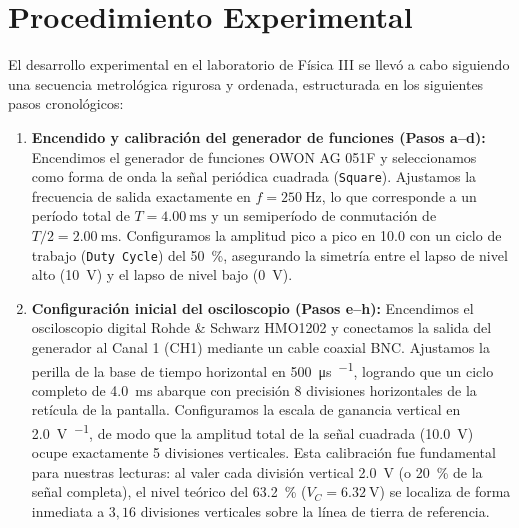 
\section{Procedimiento Experimental}
\label{sec:procedimiento}

El desarrollo experimental en el laboratorio de Física III se llevó a cabo siguiendo una secuencia metrológica rigurosa y ordenada, estructurada en los siguientes pasos cronológicos:

\begin{enumerate}
    \item \textbf{Encendido y calibración del generador de funciones (Pasos a--d):} Encendimos el generador de funciones OWON AG 051F y seleccionamos como forma de onda la señal periódica cuadrada (\texttt{Square}). Ajustamos la frecuencia de salida exactamente en $f = \qty{250}{\hertz}$, lo que corresponde a un período total de $T = \qty{4,00}{\milli\second}$ y un semiperíodo de conmutación de $T/2 = \qty{2,00}{\milli\second}$. Configuramos la amplitud pico a pico en \qty{10,0}{\voltpp} con un ciclo de trabajo (\texttt{Duty Cycle}) del \qty{50}{\percent}, asegurando la simetría entre el lapso de nivel alto (\qty{10}{\volt}) y el lapso de nivel bajo (\qty{0}{\volt}).
    
    \item \textbf{Configuración inicial del osciloscopio (Pasos e--h):} Encendimos el osciloscopio digital Rohde \& Schwarz HMO1202 y conectamos la salida del generador al Canal 1 (CH1) mediante un cable coaxial BNC. Ajustamos la perilla de la base de tiempo horizontal en \qty{500}{\micro\second\per\division}, logrando que un ciclo completo de \qty{4,0}{\milli\second} abarque con precisión 8 divisiones horizontales de la retícula de la pantalla. Configuramos la escala de ganancia vertical en \qty{2,0}{\volt\per\division}, de modo que la amplitud total de la señal cuadrada (\qty{10,0}{\volt}) ocupe exactamente 5 divisiones verticales. Esta calibración fue fundamental para nuestras lecturas: al valer cada división vertical \qty{2,0}{\volt} (o \qty{20}{\percent} de la señal completa), el nivel teórico del \qty{63,2}{\percent} ($V_C = \qty{6,32}{\volt}$) se localiza de forma inmediata a $3{,}16$ divisiones verticales sobre la línea de tierra de referencia.
    

\end{enumerate}
